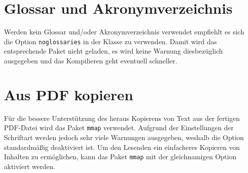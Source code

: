 
\section{Glossar und Akronymverzeichnis}
Werden kein Glossar und/oder Akronymverzeichnis verwendet empfiehlt es sich die Option \texttt{noglossaries} in der Klasse zu verwenden. Damit wird das entsprechende Paket nicht geladen, es wird keine Warnung diesbezüglich ausgegeben und das Kompilieren geht eventuell schneller.


\section{Aus PDF kopieren}
Für die bessere Unterstützung des heraus Kopierens von Text aus der fertigen PDF-Datei wird das Paket \texttt{mmap} verwendet. Aufgrund der Einstellungen der Schriftart werden jedoch sehr viele Warnungen ausgegeben, weshalb die Option standardmäßig deaktiviert ist. Um den Lesenden ein einfacheres Kopieren von Inhalten zu ermöglichen, kann das Paket \texttt{mmap} mit der gleichnamigen Option aktiviert werden.

